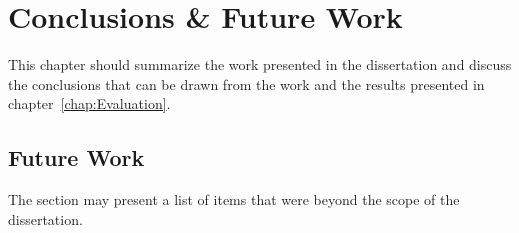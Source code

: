 \chapter{Conclusions \& Future Work}
\label{chap:Conclusions}

This chapter should summarize the work presented in the dissertation and discuss the conclusions that can be drawn from the work and the results presented in chapter~\ref{chap:Evaluation}.


\section{Future Work}

The section may present a list of items that were beyond the scope of the dissertation.